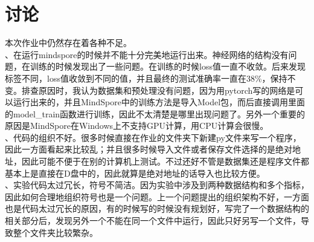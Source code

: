 \section{讨论}
\noindent 本次作业中仍然存在着各种不足。\\

、在运行mindspore的时候并不能十分完美地运行出来。神经网络的结构没有问题，在训练的时候发现出了一些问题。在训练的时候loss值一直不收敛。后来发现标签不同，loss值收敛到不同的值，并且最终的测试准确率一直在38\%，保持不变。排查原因时，我认为数据集和预处理没有问题，因为用pytorch写的网络是可以运行出来的，并且MindSpore中的训练方法是导入Model包，而后直接调用里面的model\_train函数进行训练，因此不太清楚是哪里出现问题了。另外一个重要的原因是MindSpore在Windows上不支持GPU计算，用CPU计算会很慢。\\

、代码的组织不好。很多时候直接在作业的文件夹下新建py文件来写一个程序，因此一方面看起来比较乱；并且很多时候导入文件或者保存文件选择的是绝对地址，因此可能不便于在别的计算机上测试。不过还好不管是数据集还是程序文件都基本上是直接在D盘中的，因此就算是绝对地址的话导入也比较方便。\\

、实验代码太过冗长，符号不简洁。因为实验中涉及到两种数据结构和多个指标，因此如何合理地组织符号也是一个问题。上一个问题提出的组织架构不好，一方面也是代码太过冗长的原因，有的时候写的时候没有规划好，写完了一个数据结构的相关部分后，发现另外一个不能在同一个文件中运行，因此只好另写一个文件，导致整个文件夹比较繁杂。
